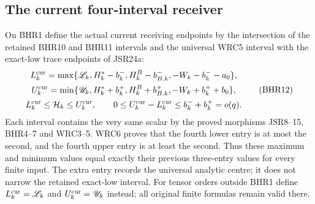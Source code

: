 \documentclass[11pt,a4paper]{article}
\begin{document}
\subsection{The current four-interval receiver}
On BHR1 define the actual current receiving endpoints
by the intersection of the retained BHR10 and BHR11
intervals and the universal WRC5 interval with the
exact-low trace endpoints of JSR24a:
\[
\begin{gathered}
 L_k^{\rm cur}=\max\{\mathscr L_k,H_k^*-b_k^-,
              H_k^B-b_{B,k}^-,-W_k-b_k^--a_0\},\\
 U_k^{\rm cur}=\min\{\mathscr U_k,H_k^*+b_k^+,
              H_k^B+b_{B,k}^+,-W_k+b_k^++b_0\},\\
 L_k^{\rm cur}\leq\mathcal H_k\leq U_k^{\rm cur},
 \qquad0\leq U_k^{\rm cur}-L_k^{\rm cur}
                       \leq b_k^-+b_k^+=o(q).
\end{gathered}\tag{BHR12}
\]
Each interval contains the very same scalar by the
proved morphisms JSR8--15, BHR4--7 and WRC3--5.
WRC6 proves that the fourth lower entry is at most the
second, and the fourth upper entry is at least the second.
Thus these maximum and minimum values equal exactly
their previous three-entry values for every finite input.
The extra entry records the universal analytic centre;
it does not narrow the retained exact-low interval.
For tensor orders outside BHR1 define
$L_k^{\rm cur}=\mathscr L_k$ and
$U_k^{\rm cur}=\mathscr U_k$ instead; all original
finite formulas remain valid there.
\end{document}
